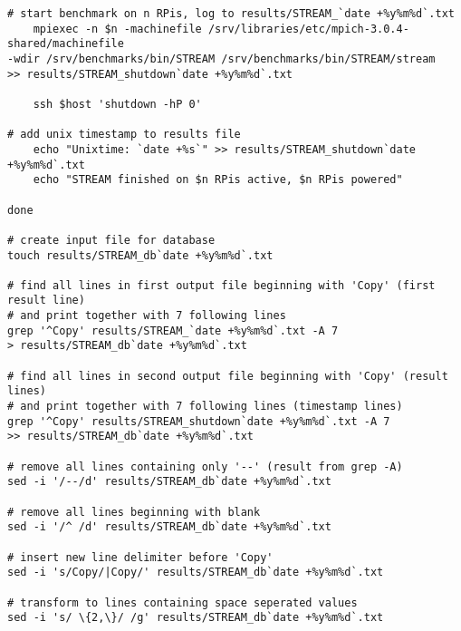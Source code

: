 \begin{verbatim}
# start benchmark on n RPis, log to results/STREAM_`date +%y%m%d`.txt                                                                                                      
	mpiexec -n $n -machinefile /srv/libraries/etc/mpich-3.0.4-shared/machinefile 
-wdir /srv/benchmarks/bin/STREAM /srv/benchmarks/bin/STREAM/stream 
>> results/STREAM_shutdown`date +%y%m%d`.txt

	ssh $host 'shutdown -hP 0'
    
# add unix timestamp to results file
	echo "Unixtime: `date +%s`" >> results/STREAM_shutdown`date +%y%m%d`.txt
	echo "STREAM finished on $n RPis active, $n RPis powered"

done

# create input file for database                                                                                                                                            
touch results/STREAM_db`date +%y%m%d`.txt

# find all lines in first output file beginning with 'Copy' (first result line) 
# and print together with 7 following lines
grep '^Copy' results/STREAM_`date +%y%m%d`.txt -A 7 
> results/STREAM_db`date +%y%m%d`.txt

# find all lines in second output file beginning with 'Copy' (result lines) 
# and print together with 7 following lines (timestamp lines)                                    
grep '^Copy' results/STREAM_shutdown`date +%y%m%d`.txt -A 7 
>> results/STREAM_db`date +%y%m%d`.txt

# remove all lines containing only '--' (result from grep -A)                                                                                                              
sed -i '/--/d' results/STREAM_db`date +%y%m%d`.txt

# remove all lines beginning with blank                                                                                                                                    
sed -i '/^ /d' results/STREAM_db`date +%y%m%d`.txt

# insert new line delimiter before 'Copy'                                                                                                                                  
sed -i 's/Copy/|Copy/' results/STREAM_db`date +%y%m%d`.txt

# transform to lines containing space seperated values                                                                                                                     
sed -i 's/ \{2,\}/ /g' results/STREAM_db`date +%y%m%d`.txt


\end{verbatim}
